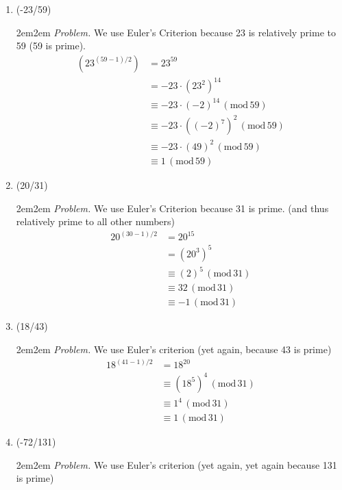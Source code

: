 \documentclass[10pt,oneside]{book}
\newcommand{\gspc}{\vspace{0.13cm}} %
\newcommand{\gmod}[1]{\,(\text{mod}\,#1)}
\let\endoldproof\endproof
\newenvironment{problem}[1]
  {\vspace{-0.1cm}\begin{coloredadjust}\begin{adjustwidth}{2em}{2em}
   \textit{Problem. }#1}
  {\endoldproof
\end{adjustwidth}\end{coloredadjust}\gspc}
\begin{document}
\begin{enumerate}
\begin{enumerate}
\begin{problem}
\begin{align*}
        &\equiv 10 \cdot 16\gmod{23}\\ 
        &\equiv 22\gmod{23}\\
        &\equiv -1 \gmod {23}
      \end{align*}
    \end{problem}
    \item (-23/59)
    \begin{problem}
      We use Euler's Criterion because 23 is relatively prime to 59 (59 is prime).
      \begin{align*}
        (23^{(59-1)/2}) &= 23^{59}\\
        &= -23\cdot(23^2)^14\\
        &\equiv -23\cdot (-2)^{14}\gmod {59}\\
        &\equiv -23 \cdot ((-2)^7)^2\gmod {59}\\
        &\equiv -23 \cdot (49)^2 \gmod{59}\\
        &\equiv 1 \gmod{59}
      \end{align*}
    \end{problem}
    \item (20/31)
    \begin{problem}
      We use Euler's Criterion because 31 is prime. (and thus relatively prime to all other numbers)
      \begin{align*}
        20^{(30-1)/2}&= 20^{15}\\
        &= (20^3)^5\\
        &\equiv (2)^5\gmod{31}\\
        &\equiv 32 \gmod{31}\\
        &\equiv -1 \gmod{31}
      \end{align*}
    \end{problem}
    \pagebreak
    \item (18/43)
    \begin{problem}
      We use Euler's criterion (yet again, because 43 is prime)
      \begin{align*}
        18^{(41-1)/2}&= 18^{20}\\
        &\equiv (18^5)^{4}\gmod{31}\\
        &\equiv 1^4\gmod{31}\\
        &\equiv 1 \gmod{31}
      \end{align*}
    \end{problem}
    \item (-72/131)
    \begin{problem}
      We use Euler's criterion (yet again, yet again because 131 is prime)

\end{problem}
\end{enumerate}
\end{enumerate}
\end{document}
